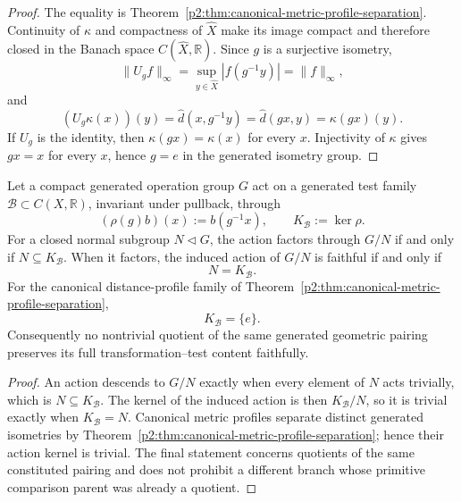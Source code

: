 \documentclass[11pt,a4paper]{article}
\begin{document}
\begin{proof}
The equality is Theorem~\ref{p2:thm:canonical-metric-profile-separation}.
Continuity of \(\kappa\) and compactness of \(\widehat X\) make its image compact and
therefore closed in the Banach space \(C(\widehat X,\mathbb R)\).  Since \(g\) is a
surjective isometry,
\[
 \lVert U_gf\rVert_\infty
 =\sup_{y\in\widehat X}|f(g^{-1}y)|
 =\lVert f\rVert_\infty,
\]
and
\[
 (U_g\kappa(x))(y)
 =\widehat d(x,g^{-1}y)
 =\widehat d(gx,y)
 =\kappa(gx)(y).
\]
If \(U_g\) is the identity, then \(\kappa(gx)=\kappa(x)\) for every \(x\).
Injectivity of \(\kappa\) gives \(gx=x\) for every \(x\), hence \(g=e\) in
the generated isometry group.
\end{proof}

\begin{theorem}
\label{p2:thm:faithful-quotient-kernel}
Let a compact generated operation group \(G\) act on a generated test family
\(\mathcal B\subset C(X,\mathbb R)\), invariant under pullback, through
\[
 (\rho(g)b)(x):=b(g^{-1}x),
 \qquad
 K_{\mathcal B}:=\ker\rho.
\]
For a closed normal subgroup \(N\triangleleft G\), the action factors through
\(G/N\) if and only if \(N\subseteq K_{\mathcal B}\).  When it factors, the
induced action of \(G/N\) is faithful if and only if
\[
 N=K_{\mathcal B}.
\]
For the canonical distance-profile family of
Theorem~\ref{p2:thm:canonical-metric-profile-separation},
\[
 K_{\mathcal B}=\{e\}.
\]
Consequently no nontrivial quotient of the same generated geometric pairing
preserves its full transformation--test content faithfully.
\end{theorem}

\begin{proof}
An action descends to \(G/N\) exactly when every element of \(N\) acts
trivially, which is \(N\subseteq K_{\mathcal B}\).  The kernel of the induced
action is then \(K_{\mathcal B}/N\), so it is trivial exactly when
\(K_{\mathcal B}=N\).  Canonical metric profiles separate distinct generated
isometries by Theorem~\ref{p2:thm:canonical-metric-profile-separation}; hence
their action kernel is trivial.  The final statement concerns quotients of the
same constituted pairing and does not prohibit a different branch whose
primitive comparison parent was already a quotient.
\end{proof}
\end{document}
